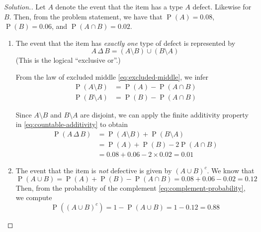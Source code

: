 \documentclass[11pt,letterpaper]{article}
\makeatletter
\theoremstyle{definition}
\theoremstyle{remark}
\newenvironment{solution}{
    \let\oldqedsymbol=\qedsymbol%
    \def\@addpunct##1{}%
    \renewcommand{\qedsymbol}{$\blacktriangleleft$}%
    \begin{proof}[\textit Solution.]
}{
    \end{proof}%
    \renewcommand{\qedsymbol}{\oldqedsymbol}
}
\newcommand{\parens}[1]{\left(#1\right)}
\newcommand{\union}{\cup}
\newcommand{\intersn}{\cap}
\newcommand{\symdiff}{\,\Delta\,}
\DeclareMathOperator{\Prob}{P}
\renewcommand{\P}[1]{\Prob{\parens{#1}}}
\makeatother
\begin{document}
\begin{solution}
    Let $A$ denote the event that the item has a type $A$ defect.
    Likewise for $B$. Then, from the problem statement, we have that
    $\P{A} = 0.08$, $\P{B} = 0.06$, and $\P{A \intersn B} = 0.02$.

    \begin{enumerate}
        \item
            The event that the item has \emph{exactly one} type of defect is
            represented by
            \begin{equation*}
                A \symdiff B = (A \setminus B) \union (B \setminus A)
            \end{equation*}
            (This is the logical ``exclusive or''.)

            From the law of excluded middle \eqref{eq:excluded-middle}, we
            infer
            \begin{align*}
                \P{A \setminus B} &= \P{A} - \P{A \intersn B} \\
                \P{B \setminus A} &= \P{B} - \P{A \intersn B}
            \end{align*}

            Since $A \setminus B$ and $B \setminus A$ are disjoint, we can
            apply the finite additivity property in
            \eqref{eq:countable-additivity} to obtain
            \begin{align*}
                \P{A \symdiff B}
                &= \P{A \setminus B} + \P{B \setminus A} \\
                &= \P{A} + \P{B}- 2\P{A \intersn B} \\
                &= 0.08 + 0.06 - 2 \times 0.02 = 0.01
            \end{align*}

        \item
            The event that the item is \emph{not} defective is given by
            $(A \union B)^c$. We know that
            \begin{equation*}
                \P{A \union B}
                = \P{A} + \P{B} - \P{A \intersn B}
                = 0.08 + 0.06 - 0.02
                = 0.12
            \end{equation*}
            Then, from the probability of the complement
            \eqref{eq:complement-probability}, we compute
            \begin{equation*}
                \P{(A \union B)^c} = 1 - \P{A \union B} = 1 - 0.12 = 0.88
            \end{equation*}

    \end{enumerate}
\end{solution}
\end{document}

